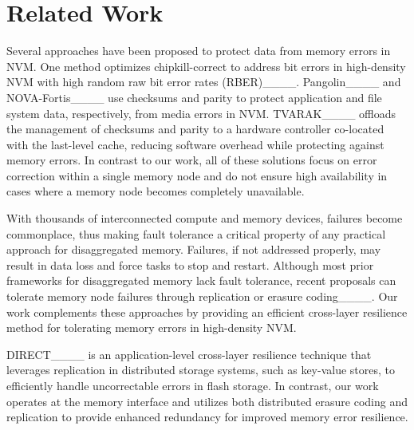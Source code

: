 \section{Related Work}
Several approaches have been proposed to protect data from memory errors in NVM. One method optimizes chipkill-correct to address bit errors in high-density NVM with high random raw bit error rates (RBER)____. Pangolin____ and NOVA-Fortis____ use checksums and parity to protect application and file system data, respectively, from media errors in NVM. TVARAK____ offloads the management of checksums and parity to a hardware controller co-located with the last-level cache, reducing software overhead while protecting against memory errors. In contrast to our work, all of these solutions focus on error correction within a single memory node and do not ensure high availability in cases where a memory node becomes completely unavailable.

With thousands of interconnected compute and memory devices, failures become commonplace, thus making fault tolerance a critical property of any practical approach for disaggregated memory. Failures, if not addressed properly, may result in data loss and force tasks to stop and restart. Although most prior frameworks for disaggregated memory lack fault tolerance, recent proposals can tolerate memory node failures through replication or erasure coding____. Our work complements these approaches by providing an efficient cross-layer resilience method for tolerating memory errors in high-density NVM.

DIRECT____ is an application-level cross-layer resilience technique that leverages replication in distributed storage systems, such as key-value stores, to efficiently handle uncorrectable errors in flash storage. 
In contrast, our work operates at the memory interface and utilizes both distributed erasure coding and replication to provide enhanced redundancy for improved memory error resilience.